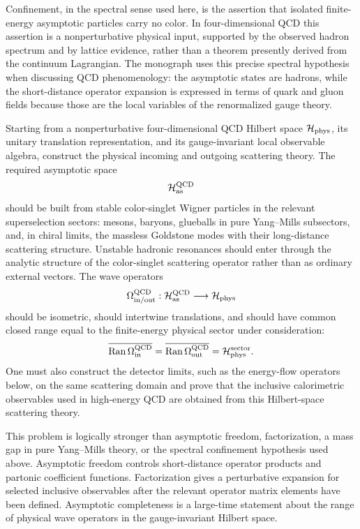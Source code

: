 Confinement, in the spectral sense used here, is the assertion that isolated
finite-energy asymptotic particles carry no color.  In four-dimensional QCD
this assertion is a nonperturbative physical input, supported by the observed
hadron spectrum and by lattice evidence, rather than a theorem presently
derived from the continuum Lagrangian.  The monograph uses this precise
spectral hypothesis when discussing QCD phenomenology: the asymptotic states
are hadrons, while the short-distance operator expansion is expressed in terms
of quark and gluon fields because those are the local variables of the
renormalized gauge theory.

\begin{openproblem}
\label{op:qcd-asymptotic-completeness}
Starting from a nonperturbative four-dimensional QCD Hilbert space
\(\mathcal H_{\rm phys}\), its unitary translation representation, and its
gauge-invariant local observable algebra, construct the physical incoming and
outgoing scattering theory.  The required asymptotic space
\[
  \mathcal H_{\rm as}^{\rm QCD}
\]
should be built from stable color-singlet Wigner particles in the relevant
superselection sectors: mesons, baryons, glueballs in pure Yang--Mills
subsectors, and, in chiral limits, the massless Goldstone modes with their
long-distance scattering structure.  Unstable hadronic resonances should enter
through the analytic structure of the color-singlet scattering operator rather
than as ordinary external vectors.  The wave operators
\[
  \Omega_{\rm in/out}^{\rm QCD}:
  \mathcal H_{\rm as}^{\rm QCD}\longrightarrow \mathcal H_{\rm phys}
\]
should be isometric, should intertwine translations, and should have common
closed range equal to the finite-energy physical sector under consideration:
\[
  \overline{\operatorname{Ran}\Omega_{\rm in}^{\rm QCD}}
  =
  \overline{\operatorname{Ran}\Omega_{\rm out}^{\rm QCD}}
  =
  \mathcal H_{\rm phys}^{\rm sector}.
\]
One must also construct the detector limits, such as the energy-flow
operators below, on the same scattering domain and prove that the inclusive
calorimetric observables used in high-energy QCD are obtained from this
Hilbert-space scattering theory.

This problem is logically stronger than asymptotic freedom, factorization, a
mass gap in pure Yang--Mills theory, or the spectral confinement hypothesis
used above.  Asymptotic freedom controls short-distance operator products and
partonic coefficient functions.  Factorization gives a perturbative expansion
for selected inclusive observables after the relevant operator matrix elements
have been defined.  Asymptotic completeness is a large-time statement about
the range of physical wave operators in the gauge-invariant Hilbert space.
\end{openproblem}

